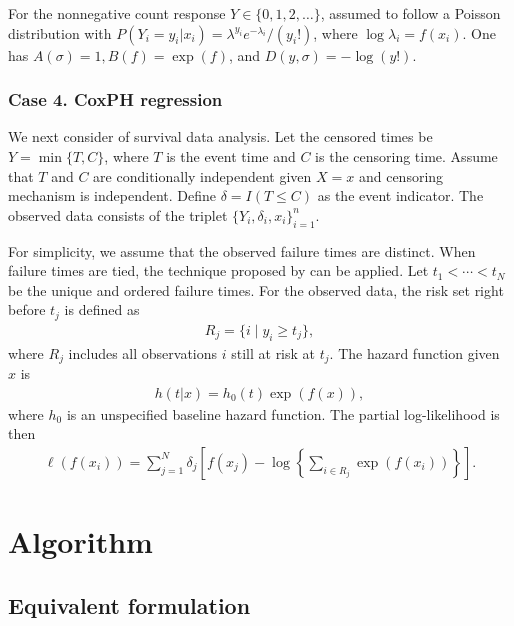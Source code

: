 For the nonnegative count response \(Y \in \{0, 1, 2, \dots \}\), assumed to follow a Poisson distribution with \(P(Y_i=y_i|x_i) = \lambda^{y_i} e^{-\lambda_i}/(y_i !)\), where \(\log \lambda_i = f(x_{i})\). One has \(A(\sigma) = 1, B(f) = \exp(f)\), and \(D(y, \sigma) = -\log(y!)\).

\hypertarget{case-4.-coxph-regression}{%
\subsubsection{Case 4. CoxPH regression}\label{case-4.-coxph-regression}}

We next consider of survival data analysis. Let the censored times be \(Y = \min \{T, C \}\), where \(T\) is the event time and \(C\) is the censoring time. Assume that \(T\) and \(C\) are conditionally independent given \(X = x\) and censoring mechanism is independent. Define \(\delta = I(T \leq C)\) as the event indicator. The observed data consists of the triplet \(\{Y_i, \delta_i, x_i\}_{i=1}^{n}\).

For simplicity, we assume that the observed failure times are distinct. When failure times are tied, the technique proposed by \citet{Breslow:1974} can be applied. Let \(t_1 < \cdots < t_N\) be the unique and ordered failure times. For the observed data, the risk set right before \(t_j\) is defined as
\begin{align*}
    R_j = \{ i \mid y_i \geq t_j \},
\end{align*}
where \(R_j\) includes all observations \(i\) still at risk at \(t_j\). The hazard function given \(x\) is
\begin{align*}
    h(t | x) = h_0(t) \exp(f(x)),
\end{align*}
where \(h_0\) is an unspecified baseline hazard function. The partial log-likelihood is then
\begin{align}
    \ell(f(x_i)) = \sum_{j=1}^{N} \delta_j \left[ f(x_j) - \log \left\{ \sum_{i \in R_j} \exp(f(x_i)) \right\} \right].
    \label{eq:partiallik} 
\end{align}

\hypertarget{sec3}{%
\section{Algorithm}\label{sec3}}

\hypertarget{ssec3_1}{%
\subsection{Equivalent formulation}\label{ssec3_1}}

